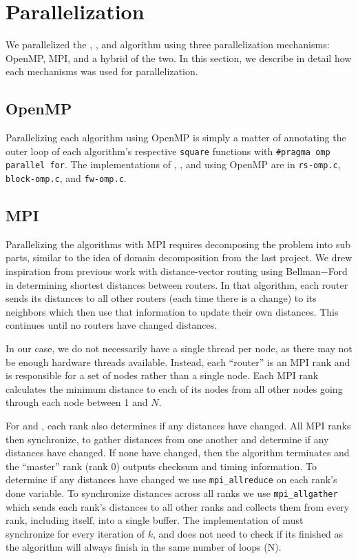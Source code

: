 \section{Parallelization}\label{sec:parallelization}
We parallelized the \rs{}, \block{}, and \fw{} algorithm using three
parallelization mechanisms: OpenMP, MPI, and a hybrid of the two. In this
section, we describe in detail how each mechanisms was used for parallelization.

\subsection{OpenMP}
Parallelizing each algorithm using OpenMP is simply a matter of annotating the
outer loop of each algorithm's respective \texttt{square} functions with
\texttt{\#pragma omp parallel for}. The implementations of \rs{}, \block{}, and
\fw{} using OpenMP are in \texttt{rs-omp.c}, \texttt{block-omp.c}, and
\texttt{fw-omp.c}.

\subsection{MPI}
Parallelizing the algorithms with MPI requires decomposing the problem into sub
parts, similar to the idea of domain decomposition from the last project. We
drew inspiration from previous work with distance-vector routing using
Bellman$-$Ford in determining shortest distances between routers. In that
algorithm, each router sends its distances to all other routers (each time
there is a change) to its neighbors which then use that information to update
their own distances. This continues until no routers have changed distances.

In our case, we do not necessarily have a single thread per node, as there may
not be enough hardware threads available. Instead, each ``router'' is an MPI
rank and is responsible for a set of nodes rather than a single node. Each MPI
rank calculates the minimum distance to each of its nodes from all other nodes
going through each node between 1 and $N$.

For \rs{} and \block{}, each rank also determines if any distances have
changed.  All MPI ranks then synchronize, to gather distances from one another
and determine if any distances have changed. If none have changed, then the
algorithm terminates and the ``master'' rank (rank 0) outputs checksum and
timing information. To determine if any distances have changed we use
\texttt{mpi\_allreduce} on each rank's done variable. To synchronize distances
across all ranks we use \texttt{mpi\_allgather} which sends each rank's
distances to all other ranks and collects them from every rank, including
itself, into a single buffer. The implementation of \fw{} must synchronize for
every iteration of $k$, and does not need to check if its finished as the
algorithm will always finish in the same number of loops (N).

